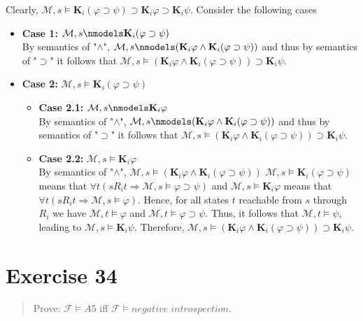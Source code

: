 \documentclass[11pt,a4paper]{article}
\newcommand{\lto}{\supset}
\newcommand{\eall}{\mathbf{K}}
\newcommand{\sto}{\Rightarrow}
\begin{document}
\begin{itemize}
Clearly, $\mathcal{M},s \models \eall_i(\varphi \lto \psi) \lto  \eall_i \varphi \lto \eall_i \psi$. Consider the following cases
\begin{itemize}
\item  \textbf{Case 1:} $\mathcal{M}, s \nmodels \eall_i(\varphi \lto \psi)$ \\
By semantics of "$\land$", $\mathcal{M},s \nmodels  (\eall_i \varphi \land \eall_i (\varphi \lto \psi))$ and thus by semantics of "$\lto$" it follows that $\mathcal{M},s \models  (\eall_i \varphi \land \eall_i (\varphi \lto \psi)) \lto \eall_i \psi$.
\item  \textbf{Case 2:} $\mathcal{M}, s \models \eall_i(\varphi \lto \psi)$ \\
\begin{itemize}
\item  \textbf{Case 2.1:} $\mathcal{M}, s \nmodels \eall_i \varphi$ \\
By semantics of "$\land$", $\mathcal{M},s \nmodels  (\eall_i \varphi \land \eall_i (\varphi \lto \psi))$ and thus by semantics of "$\lto$" it follows that $\mathcal{M},s \models  (\eall_i \varphi \land \eall_i (\varphi \lto \psi)) \lto \eall_i \psi$.

\item  \textbf{Case 2.2:} $\mathcal{M}, s \models \eall_i \varphi$ \\
By semantics of "$\land$", $\mathcal{M},s \models  (\eall_i \varphi \land \eall_i (\varphi \lto \psi))$
$\mathcal{M}, s \models \eall_i (\varphi \lto \psi)$ means that $\forall t (sR_i t \sto \mathcal{M},s \models \varphi \lto \psi )$ and $\mathcal{M}, s \models \eall_i \varphi$ means that $\forall t (sR_i t \sto \mathcal{M},s \models \varphi )$. Hence, for all states $t$ reachable from $s$ through $R_i$ we have $\mathcal{M}, t \models \varphi$ and $\mathcal{M}, t \models \varphi \lto \psi$. Thus, it follows that $\mathcal{M}, t \models \psi$, leading to $\mathcal{M}, s\models \eall_i \psi$. Therefore, $\mathcal{M}, s\models  (\eall_i \varphi \land \eall_i (\varphi \lto \psi)) \lto \eall_i \psi$.
\end{itemize}
\end{itemize}
\end{itemize}

\section*{Exercise 34}
\begin{quote}
Prove: $\mathcal{F} \models A5$ iff $\mathcal{F} \models \mathit{negative \;  introspection}$.
\end{quote}
\end{document}
